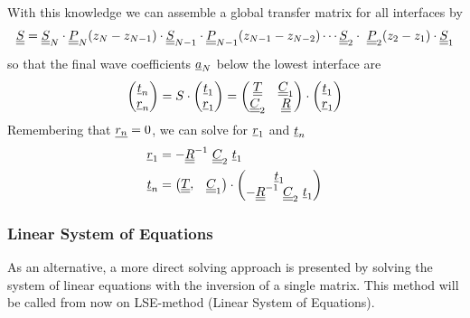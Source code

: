 With this knowledge we can assemble a global transfer matrix for all interfaces
by
\begin{equation} \label{eq:Scomposition}
    \underline{\underline{S}} = \underline{\underline{S}}_N\cdot \underline{\underline{P}}_{N}(z_{N}-z_{N-1})\cdot
    \underline{\underline{S}}_{N-1} \cdot \underline{\underline{P}}_{N-1}(z_{N-1}-z_{N-2}) \cdots
    \underline{\underline{S}}_2
    \cdot \ \underline{\underline{P}}_2(z_{2}-z_{1}) \cdot \underline{\underline{S}}_1
\end{equation}
so that the final wave coefficients $\underline{a}_N$ below the lowest interface
are
\begin{equation}
    \begin{pmatrix} \underline{t}_n \\ \underline{r}_n	\end{pmatrix}
    = S\cdot  \begin{pmatrix} \underline{t}_1 \\ \underline{r}_1 \end{pmatrix} =
    \begin{pmatrix}
        \underline{\underline{T}} & \underline{\underline{C}}_1 \\ \underline{\underline{C}}_2 & \underline{\underline{R}}
    \end{pmatrix} \cdot \begin{pmatrix} \underline{t}_1 \\ \underline{r}_1
    \end{pmatrix}
\end{equation}
Remembering that $\underline{r_n}=0$, we can solve for $\underline{r}_1$ and
$\underline{t}_n$
\begin{align} \label{eq:TMMcoeffsr}
    \uline{r}_1 & = -\uuline{R}^{-1}\ \uuline{C}_2\ \uline{t}_1             \\
    \uline{t}_n & = \begin{pmatrix} \uuline{T},& \uuline{C}_1 \end{pmatrix}
    \cdot \begin{pmatrix} \uline{t}_1 \\ -\uuline{R}^{-1}\ \uuline{C}_2\
              \uline{t}_1\end{pmatrix} \label{eq:TMMcoeffst}
\end{align}

\subsubsection{Linear System of Equations}
As an alternative, a more direct solving approach is presented by solving the
system of linear equations with the inversion of a single matrix. This method
will be called from now on LSE-method (Linear System of Equations).

